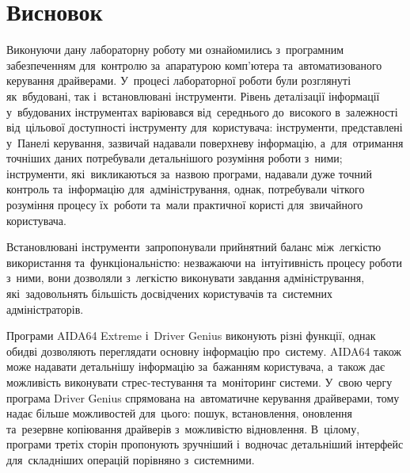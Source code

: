 \documentclass[
	a4paper,
	oneside,
	DIV = 12,
	12pt,
	headings = normal,
]{scrartcl}
\newcommand{\allcaps}[1]{{\addfontfeatures{LetterSpace = 5}#1}}
\begin{document}
	\section{Висновок}
		Виконуючи дану лабораторну роботу ми ознайомились з~програмним забезпеченням для~контролю за~апаратурою комп'ютера та~автоматизованого керування драйверами. У~процесі лабораторної роботи були розглянуті як~вбудовані, так і~встановлювані інструменти. Рівень деталізації інформації у~вбудованих інструментах варіювався від~середнього до~високого в~залежності від~цільової доступності інструменту для~користувача: інструменти, представлені у~Панелі керування, зазвичай надавали поверхневу інформацію, а~для~отримання точніших даних потребували детальнішого розуміння роботи з~ними; інструменти, які~викликаються за~назвою програми, надавали дуже точний контроль та~інформацію для~адміністрування, однак, потребували чіткого розуміння процесу їх~роботи та~мали практичної користі для~звичайного користувача.
		
		Встановлювані інструменти~запропонували прийнятний баланс між~легкістю використання та~функціональністю: незважаючи на~інтуітивність процесу роботи з~ними, вони дозволяли з~легкістю виконувати завдання адміністрування, які~задовольнять більшість досвідчених користувачів та~системних адміністраторів.

		Програми \allcaps{AIDA64} Extreme і~Driver Genius виконують різні функції, однак обидві дозволяють переглядати основну інформацію про~систему. \allcaps{AIDA64} також може надавати детальнішу інформацію за~бажанням користувача, а~також дає можливість виконувати стрес-тестування та~моніторинг системи. У~свою чергу програма Driver Genius спрямована на~автоматичне керування драйверами, тому надає більше можливостей для~цього: пошук, встановлення, оновлення та~резервне копіювання драйверів з~можливістю відновлення. В~цілому, програми третіх сторін пропонують зручніший і~водночас детальніший інтерфейс для~складніших операцій порівняно з~системними.
\end{document}
